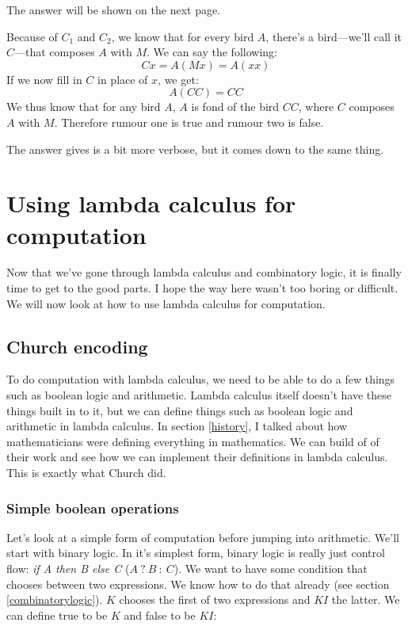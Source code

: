 \documentclass[11pt]{article}
\begin{document}
The answer will be shown on the next page.

\newpage

Because of \(C_{1}\) and \(C_{2}\), we know that for every bird \(A\), there's
a bird---we'll call it \(C\)---that composes \(A\) with \(M\). We can say the
following:
\[Cx=A(Mx)=A(xx)\] 
If we now fill in \(C\) in place of \(x\), we get:
\[A(CC)=CC\]
We thus know that for any bird \(A\), \(A\) is fond of the bird \(CC\), where
\(C\) composes \(A\) with \(M\). Therefore rumour one is true and rumour two is
false.

The answer \textcite{smullyan2000} gives is a bit more verbose, but it comes
down to the same thing.

\section{Using lambda calculus for computation}\label{computation}

Now that we've gone through lambda calculus and combinatory logic, it is
finally time to get to the good parts. I hope the way here wasn't too boring or
difficult. We will now look at how to use lambda calculus for computation.

\subsection{Church encoding}

To do computation with lambda calculus, we need to be able to do a few things
such as boolean logic and arithmetic. Lambda calculus itself doesn't have these
things built in to it, but we can define things such as boolean logic and
arithmetic in lambda calculus. In section \ref{history}, I talked about how
mathematicians were defining everything in mathematics. We can build of of
their work and see how we can implement their definitions in lambda calculus.
This is exactly what Church did.


\subsubsection{Simple boolean operations}\label{boolops}

Let's look at a simple form of computation before jumping into arithmetic.
We'll start with binary logic. In it's simplest form, binary logic is really
just control flow: \emph{if A then B else C} (\(A\:?\:B\::\:C\)). We want to
have some condition that chooses between two expressions. We know how to do
that already (see section \ref{combinatorylogic}). \(K\) chooses the first of
two expressions and \(KI\) the latter. We can define true to be \(K\) and false
to be \(KI\):
\end{document}
